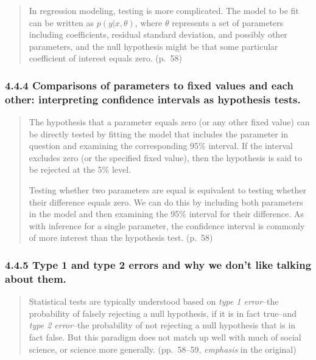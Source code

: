 \documentclass[
]{article}
\begin{document}
\begin{quote}
In regression modeling, testing is more complicated. The model to be fit
can be written as \(p(y|x, \theta)\), where \(\theta\) represents a set
of parameters including coefficients, residual standard deviation, and
possibly other parameters, and the null hypothesis might be that some
particular coefficient of interest equals zero. (p.~58)
\end{quote}

\hypertarget{comparisons-of-parameters-to-fixed-values-and-each-other-interpreting-confidence-intervals-as-hypothesis-tests.}{%
\subsubsection{4.4.4 Comparisons of parameters to fixed values and each
other: interpreting confidence intervals as hypothesis
tests.}\label{comparisons-of-parameters-to-fixed-values-and-each-other-interpreting-confidence-intervals-as-hypothesis-tests.}}

\begin{quote}
The hypothesis that a parameter equals zero (or any other fixed value)
can be directly tested by fitting the model that includes the parameter
in question and examining the corresponding 95\% interval. If the
interval excludes zero (or the specified fixed value), then the
hypothesis is said to be rejected at the 5\% level.

Testing whether two parameters are equal is equivalent to testing
whether their difference equals zero. We can do this by including both
parameters in the model and then examining the 95\% interval for their
difference. As with inference for a single parameter, the confidence
interval is commonly of more interest than the hypothesis test. (p.~58)
\end{quote}

\hypertarget{type-1-and-type-2-errors-and-why-we-dont-like-talking-about-them.}{%
\subsubsection{4.4.5 Type 1 and type 2 errors and why we don't like
talking about
them.}\label{type-1-and-type-2-errors-and-why-we-dont-like-talking-about-them.}}

\begin{quote}
Statistical tests are typically understood based on \emph{type 1
error}--the probability of falsely rejecting a null hypothesis, if it is
in fact true--and \emph{type 2 error}--the probability of not rejecting
a null hypothesis that is in fact false. But this paradigm does not
match up well with much of social science, or science more generally.
(pp.~58--59, \emph{emphasis} in the original)
\end{quote}
\end{document}
